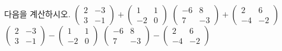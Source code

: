 다음을 계산하시오.
 $\begin{pmatrix} 2 & -3 \\ 3 & -1 \end{pmatrix}+\begin{pmatrix} 1 & 1 \\ -2 & 0 \end{pmatrix}$
 $\begin{pmatrix} -6 & 8 \\ 7 & -3 \end{pmatrix}+\begin{pmatrix} 2 & 6 \\ -4 & -2 \end{pmatrix}$
 $\begin{pmatrix} 2 & -3 \\ 3 & -1 \end{pmatrix}-\begin{pmatrix} 1 & 1 \\ -2 & 0 \end{pmatrix}$
 $\begin{pmatrix} -6 & 8 \\ 7 & -3 \end{pmatrix}-\begin{pmatrix} 2 & 6 \\ -4 & -2 \end{pmatrix}$
